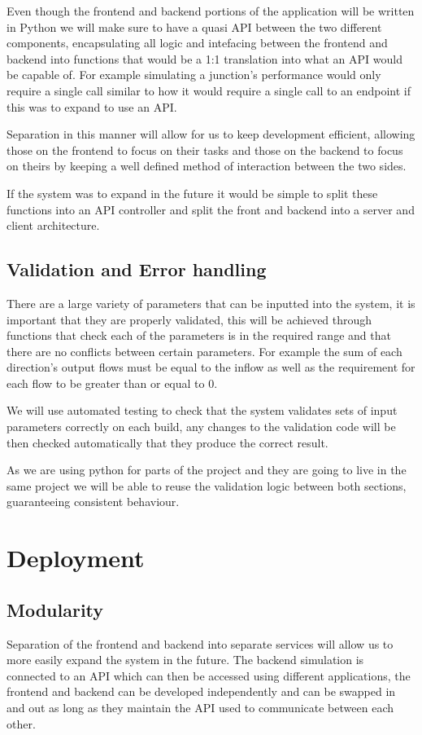\documentclass{article}
\begin{document}
Even though the frontend and backend portions of the application will be 
written in Python we will make sure to have a quasi API between the two 
different components, encapsulating all logic and intefacing between the 
frontend and backend into functions that would be a 1:1 translation into 
what an API would be capable of. For example simulating a junction's 
performance would only require a single call similar to how it would require 
a single call to an endpoint if this was to expand to use an API.

Separation in this manner will allow for us to keep development efficient, 
allowing those on the frontend to focus on their tasks and those on the 
backend to focus on theirs by keeping a well defined method of interaction 
between the two sides.

If the system was to expand in the future it would be simple to split these 
functions into an API controller and split the front and backend into a 
server and client architecture.

\subsection{Validation and Error handling}

There are a large variety of parameters that can be inputted into the system, it is 
important that they are properly validated, this will be achieved through functions 
that check each of the parameters is in the required range and that there are no 
conflicts between certain parameters. For example the sum of each direction's output 
flows must be equal to the inflow as well as the requirement for each flow to be 
greater than or equal to 0. 

We will use automated testing to check that the system validates sets of input 
parameters correctly on each build, any changes to the validation code will be then 
checked automatically that they produce the correct result. 

As we are using python for parts of the project and they are going to live 
in the same project we will be able to reuse the validation logic between both 
sections, guaranteeing consistent behaviour.


\section{Deployment}

\subsection{Modularity}
Separation of the frontend and backend into separate services will allow us to more 
easily expand the system in the future. The backend simulation is connected to an API 
which can then be accessed using different applications, the frontend and backend can 
be developed independently and can be swapped in and out as long as they maintain the 
API used to communicate between each other.
\end{document}
